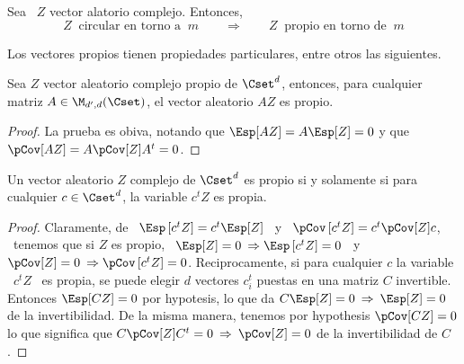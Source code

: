 \begin{teorema}[Circularidad]
\label{Teo:MP:Circularidad}
%
  Sea   \   $Z$ vector alatorio complejo.  Entonces,
%
  \[
  Z \:  \mbox{ circular en torno  a } \:  m \qquad \Longrightarrow \qquad  Z \:
  \mbox{ propio en torno de } \: m
  \]
\end{teorema}

Los vectores propios tienen  propiedades particulares, entre otros las siguientes.

\begin{teorema}\label{Teo:MP:PropioLineal}
%
  Sea  $Z$  vector  aleatorio  complejo  propio  de  $\Cset^d$,  entonces,  para
  cualquier matriz $A \in \M_{d',d}(\Cset)$, el vector aleatorio $A Z$ es propio.
\end{teorema}
\begin{proof}
  La prueba es obiva, notando que $\Esp[A Z]  = A \Esp[Z] = 0$ y que $\pCov[A Z]
  = A \pCov[Z] A^t = 0$.
\end{proof}


\begin{teorema}\label{Teo:MP:PropioProy}
%
  Un vector  aleatorio $Z$ complejo de  $\Cset^d$ es propio si  y solamente si para
  cualquier $c \in \Cset^d$, la variable $c^t Z$ es propia.
\end{teorema}
\begin{proof}
  Claramente, de \  $\Esp\left[ c^t Z \right] = c^t \Esp[Z]$  \ y \ $\pCov\left[
    c^t Z \right] = c^t \pCov[Z] c$,  \ tenemos que si $Z$ es propio, \ $\Esp[Z]
  = 0  \: \Rightarrow  \Esp\left[ c^t  Z \right]  = 0$ \  y \  $\pCov[Z] =  0 \:
  \Rightarrow \pCov\left[  c^tZ \right] =  0$. \newline Reciprocamente,  si para
  cualquier $c$ la variable \ $c^t Z$  \ es propia, se puede elegir $d$ vectores
  $c_i^t$ puestas  en una matriz  $C$ invertible. Entonces  $\Esp[C Z] =  0$ por
  hypotesis, lo  que da  $C \Esp[Z] =  0 \:  \Rightarrow \: \Esp[Z]  = 0$  de la
  invertibilidad. De la misma manera, tenemos por hypothesis $\pCov[C Z] = 0$ lo
  que significa que  $C \pCov[Z] C^t = 0  \: \Rightarrow \: \pCov[Z] =  0$ de la
  invertibilidad de $C$.
\end{proof}



